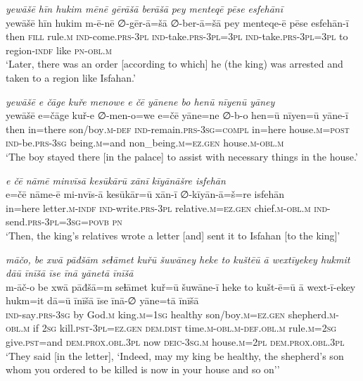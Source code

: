 \ea \label{KŠ.47}
\textit{yewāšē hīn hukim mēnē gērāšā berāšā pey menteqē pēse esfehānī} \\ 
\gll yewāšē hīn hukim m-ē-nē ∅-gēr-ā=šā ∅-ber-ā=šā pey menteqe-ē pēse esfehān-ī \\ 
 then \textsc{fill} rule\textsc{.m} \textsc{ind-}come\textsc{.prs}\textsc{-3pl} \textsc{ind-}take\textsc{.prs}\textsc{-3pl}\textsc{=3pl} \textsc{ind-}take\textsc{.prs}\textsc{-3pl}\textsc{=3pl} to region\textsc{-indf} like \textsc{pn}\textsc{-obl}\textsc{.m} \\ 
\glt `Later, there was an order [according to which] he (the king) was arrested and taken to a region like Isfahan.'
\z 
 
\ea \label{KŠ.49}
\textit{yewāšē e čāge kuře menowe e čē yānene bo henū nīyenū yāney} \\ 
\gll yewāšē e=čāge kuř-e ∅-men-o=we e=čē yāne=ne ∅-b-o hen=ū nīyen=ū yāne-ī \\ 
 then in=there son/boy\textsc{.m}\textsc{-def} \textsc{ind-}remain\textsc{.prs}\textsc{-3sg}\textsc{=compl} in=here house\textsc{.m}\textsc{=\textsc{post}} \textsc{ind-}be\textsc{.prs}\textsc{-3sg} being\textsc{.m}=and non\_being\textsc{.m}\textsc{=ez.gen} house\textsc{.m}\textsc{-obl}\textsc{.m} \\ 
\glt `The boy stayed there [in the palace] to assist with necessary things in the house.'
\z 
 
\ea \label{KŠ.50}
\textit{e čē nāmē minvīsā kesūkārū xānī kīyānāšre isfehān} \\ 
\gll e=čē nāme-ē mi-nvīs-ā kesūkār=ū xān-ī ∅-kīyān-ā=š=re isfehān \\ 
 in=here letter\textsc{.m}\textsc{-indf} \textsc{ind-}write\textsc{.prs}\textsc{-3pl} relative\textsc{.m}\textsc{=ez.gen} chief\textsc{.m}\textsc{-obl}\textsc{.m} \textsc{ind-}send\textsc{.prs}\textsc{-3pl}\textsc{=3sg}\textsc{=\textsc{povb}} \textsc{pn} \\ 
\glt `Then, the king’s relatives wrote a letter [and] sent it to Isfahan [to the king]'
\z 
 
\ea \label{KŠ.51}
\textit{māčo, be xwā pāđšām seɫāmet kuřū šuwāney heke to kuštēū ā wextīyekey hukmit dāū īnīšā īse īnā yānetā īnīšā} \\ 
\gll m-āč-o be xwā pāđšā=m seɫāmet kuř=ū šuwāne-ī heke to kušt-ē=ū ā wext-ī-ekey hukm=it dā=ū īnīšā īse īnā-∅ yāne=tā īnīšā \\ 
 \textsc{ind-}say\textsc{.prs}\textsc{-3sg} by God\textsc{.m} king\textsc{.m}\textsc{=\textsc{1sg}} healthy son/boy\textsc{.m}\textsc{=ez.gen} shepherd\textsc{.m}\textsc{-obl}\textsc{.m} if \textsc{2sg} kill\textsc{.pst}\textsc{-3pl}\textsc{=ez.gen} \textsc{dem.dist} time\textsc{.m}\textsc{-obl}\textsc{.m}\textsc{-def}\textsc{.obl}\textsc{.m} rule\textsc{.m}\textsc{=\textsc{2sg}} give\textsc{.pst}=and \textsc{dem.prox}\textsc{.obl}\textsc{.3pl} now \textsc{deic}\textsc{-3sg}\textsc{.m} house\textsc{.m}=\textsc{2pl} \textsc{dem.prox}\textsc{.obl}\textsc{.3pl} \\ 
\glt `They said [in the letter], ‘Indeed, may my king be healthy, the shepherd’s son whom you ordered to be killed is now in your house and so on’'
\z 
 
